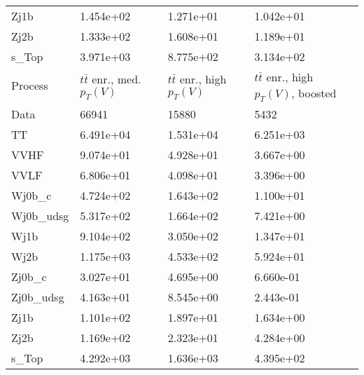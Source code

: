 \begin{table}
{\begin{tabularx}{0.8\textwidth}{|X|X|X|X|}
Zj1b & 1.454e+02 & 1.271e+01 & 1.042e+01 \\
Zj2b & 1.333e+02 & 1.608e+01 & 1.189e+01 \\
s\_Top & 3.971e+03 & 8.775e+02 & 3.134e+02 \\
\hline
\hline
Process & $t\bar{t}$ enr., med. $p_{T}(V)$ & $t\bar{t}$ enr., high $p_{T}(V)$ & $t\bar{t}$ enr., high $p_{T}(V)$, boosted \\
\hline
Data & 66941 & 15880 & 5432 \\
\hline
TT & 6.491e+04 & 1.531e+04 & 6.251e+03 \\
VVHF & 9.074e+01 & 4.928e+01 & 3.667e+00 \\
VVLF & 6.806e+01 & 4.098e+01 & 3.396e+00 \\
Wj0b\_c & 4.724e+02 & 1.643e+02 & 1.100e+01 \\
Wj0b\_udsg & 5.317e+02 & 1.664e+02 & 7.421e+00 \\
Wj1b & 9.104e+02 & 3.050e+02 & 1.347e+01 \\
Wj2b & 1.175e+03 & 4.533e+02 & 5.924e+01 \\
Zj0b\_c & 3.027e+01 & 4.695e+00 & 6.660e-01 \\
Zj0b\_udsg & 4.163e+01 & 8.545e+00 & 2.443e-01 \\
Zj1b & 1.101e+02 & 1.897e+01 & 1.634e+00 \\
Zj2b & 1.169e+02 & 2.323e+01 & 4.284e+00 \\
s\_Top & 4.292e+03 & 1.636e+03 & 4.395e+02 \\
\hline
\end{tabularx}
}
\label{tab:cr-Wen-2018}
\end{table}

